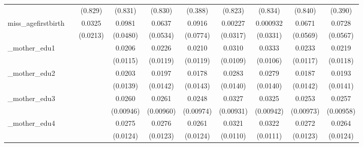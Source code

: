 \begin{table}[htbp]
\begin{tabular}{l*{9}{c}}
            &                     &     (0.829)         &     (0.831)         &     (0.830)         &     (0.388)         &     (0.823)         &     (0.834)         &     (0.840)         &     (0.390)         \\
[1em]
miss\_agefirstbirth&                     &      0.0325         &      0.0981\sym{**} &      0.0637         &      0.0916         &     0.00227         &    0.000932         &      0.0671         &      0.0728         \\
            &                     &    (0.0213)         &    (0.0480)         &    (0.0534)         &    (0.0774)         &    (0.0317)         &    (0.0331)         &    (0.0569)         &    (0.0567)         \\
[1em]
\_mother\_edu1&                     &                     &      0.0206\sym{*}  &      0.0226\sym{*}  &      0.0210\sym{*}  &      0.0310\sym{***}&      0.0333\sym{***}&      0.0233\sym{**} &      0.0219\sym{*}  \\
            &                     &                     &    (0.0115)         &    (0.0119)         &    (0.0119)         &    (0.0109)         &    (0.0106)         &    (0.0117)         &    (0.0118)         \\
[1em]
\_mother\_edu2&                     &                     &      0.0203         &      0.0197         &      0.0178         &      0.0283\sym{**} &      0.0279\sym{**} &      0.0187         &      0.0193         \\
            &                     &                     &    (0.0139)         &    (0.0142)         &    (0.0143)         &    (0.0140)         &    (0.0140)         &    (0.0142)         &    (0.0141)         \\
[1em]
\_mother\_edu3&                     &                     &      0.0260\sym{***}&      0.0261\sym{***}&      0.0248\sym{**} &      0.0327\sym{***}&      0.0325\sym{***}&      0.0253\sym{***}&      0.0257\sym{***}\\
            &                     &                     &   (0.00946)         &   (0.00960)         &   (0.00974)         &   (0.00931)         &   (0.00942)         &   (0.00973)         &   (0.00958)         \\
[1em]
\_mother\_edu4&                     &                     &      0.0275\sym{**} &      0.0276\sym{**} &      0.0261\sym{**} &      0.0321\sym{***}&      0.0322\sym{***}&      0.0272\sym{**} &      0.0264\sym{**} \\
            &                     &                     &    (0.0124)         &    (0.0123)         &    (0.0124)         &    (0.0110)         &    (0.0111)         &    (0.0123)         &    (0.0124)         \\

\end{tabular}
\end{table}
